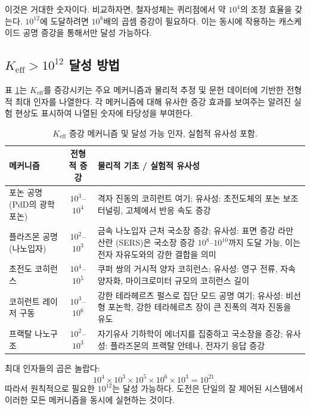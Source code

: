 \documentclass[11pt,a4paper]{article}
\theoremstyle{remark}
\newcommand{\Keff}{K_{\mathrm{eff}}}
\begin{document}
	이것은 거대한 숫자이다. 비교하자면, 철자성체는 퀴리점에서 약 \(10^4\)의 조정 효율을 갖는다. \(10^{12}\)에 도달하려면 \(10^8\)배의 곱셈 증강이 필요하다. 이는 동시에 작용하는 캐스케이드 공명 증강을 통해서만 달성 가능하다.
	
	\subsection{\(\Keff > 10^{12}\) 달성 방법}
	
	표 \ref{tab:enhancement}는 \(\Keff\)를 증강시키는 주요 메커니즘과 물리적 추정 및 문헌 데이터에 기반한 전형적 최대 인자를 나열한다. 각 메커니즘에 대해 유사한 증강 효과를 보여주는 알려진 실험 현상도 표시하여 나열된 숫자에 타당성을 부여한다.
	
	\begin{table}[htbp]
		\centering
		\caption{\(\Keff\) 증강 메커니즘 및 달성 가능 인자, 실험적 유사성 포함.}
		\label{tab:enhancement}
		\small
		\begin{tabularx}{\textwidth}{>{\raggedright\arraybackslash}p{3.2cm} c X}
			\toprule
			\textbf{메커니즘} & \textbf{전형적 증강} & \textbf{물리적 기초 / 실험적 유사성} \\
			\midrule
			포논 공명 (PdD의 광학 포논) & \(10^3\)–\(10^4\) & 격자 진동의 코히런트 여기; 유사성: 초전도체의 포논 보조 터널링, 고체에서 반응 속도 증강 \cite{Storms2014, Tinkham2004} \\
			플라즈몬 공명 (나노입자) & \(10^2\)–\(10^3\) & 금속 나노입자 근처 국소장 증강; 유사성: 표면 증강 라만 산란 (SERS)은 국소장 증강 \(10^8\)–\(10^{10}\)까지 도달 가능, 이는 전자 자유도와의 강한 결합을 의미 \cite{Maier2007, SERS} \\
			초전도 코히런스 & \(10^4\)–\(10^5\) & 쿠퍼 쌍의 거시적 양자 코히런스; 유사성: 영구 전류, 자속 양자화, 마이크로미터 규모의 코히런스 길이 \cite{Tinkham2004} \\
			코히런트 레이저 구동 & \(10^3\)–\(10^6\) & 강한 테라헤르츠 펄스로 집단 모드 공명 여기; 유사성: 비선형 포논학, 강한 테라헤르츠 장이 큰 진폭의 격자 진동을 유도 \cite{Kampfrath2011} \\
			프랙탈 나노구조 & \(10^2\)–\(10^3\) & 자기유사 기하학이 에너지를 집중하고 국소장을 증강; 유사성: 플라즈몬의 프랙탈 안테나, 전자기 응답 증강 \cite{Mandelbrot1982, fractal-antenna} \\
			\bottomrule
		\end{tabularx}
	\end{table}
	
	최대 인자들의 곱은 놀랍다:
	\[
	10^4 \times 10^3 \times 10^5 \times 10^6 \times 10^3 = 10^{21}.
	\]
	따라서 원칙적으로 필요한 \(10^{12}\)는 달성 가능하다. 도전은 단일의 잘 제어된 시스템에서 이러한 모든 메커니즘을 동시에 실현하는 것이다.
	
\end{document}
